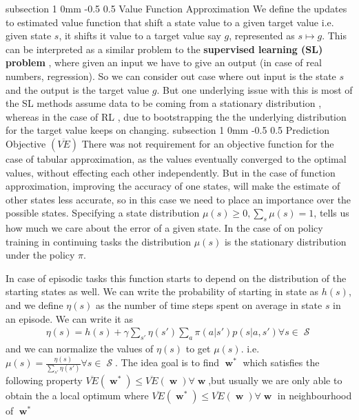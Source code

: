 \documentclass[twocolumn,11pt]{article}
\makeatletter
\DeclareMathOperator{\w}{\textbf{w}}
\DeclareMathOperator{\state}{\mathcal{S}}
\renewcommand{\subsection}{\@startsection
{subsection}%
{1}%
{0mm}%
{-0.5\baselineskip}%
{0.5\baselineskip}%
{\bfseries\color{blue}}} %
\makeatother
\begin{document}
\subsection{Value Function Approximation}
We define  the updates to estimated value function that shift a  state value to a given target value i.e. given state $s$, it  shifts it  value to a target value say $g$, represented as $s \mapsto g$. This can be interpreted as a similar problem to the \textbf{supervised learning (SL) problem }, where given  an input we have to give an  output (in case of real numbers, regression).  So we  can  consider out case where  out input is the state $s$ and the output is the target value $g$. But one underlying issue with this is most of  the SL methods assume data  to be coming from a stationary distribution , whereas  in the case of RL , due to bootstrapping the  the underlying  distribution for the target value keeps on changing.
\subsection{Prediction Objective $(\overline{VE})$}
There was not requirement for an objective function for the case of tabular approximation, as the values eventually converged to the optimal values, without effecting each other independently. 
But in the case of function approximation, improving the accuracy of one states, will make the estimate of other  states  less accurate, so in this  case we need to place an importance over the possible states.
Specifying a state distribution $\mu(s) \geq 0, \sum_s \mu(s) =  1$, tells us how much we care about the error of a given state. In the case of on policy training in continuing tasks the distribution $\mu(s)$ is the  stationary distribution under the policy $\pi$.

In case of episodic tasks this function starts to depend on the distribution of the starting states as well.
We can write the  probability of starting in state as $h(s)$, and we  define $\eta(s)$  as the number  of time steps spent on average in state $s$ in an episode. We can write it as \useshortskip \begin{align*}
\eta(s) = h(s) +  \gamma \sum_{s'} \eta(s') \sum_a \pi(a|s') p(s|a, s')\forall s\in \state
\end{align*} and we  can normalize the values of $\eta(s)$ to get $\mu(s)$. i.e. $\mu(s)  = \tfrac{\eta(s)}{\sum_{s'}\eta(s')} \forall s \in \state$.  The idea goal is to find $\w^*$  which satisfies the following property $\overline{VE}(\w^*) \leq \overline{VE}(\w) \forall \w$,but usually we are only able to obtain the a local optimum where $\overline{VE}(\w^*) \leq \overline{VE}(\w) \forall \w $ in neighbourhood of $\w^*$
\end{document}
